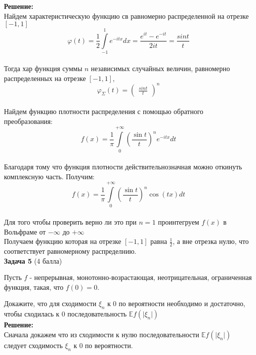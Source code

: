 \documentclass{article}
\begin{document}
\textbf{Решение:}\\
Найдем характеристическую функцию св равномерно 
распределенной на отрезке $[-1, 1]$\\
$$\varphi(t) = \frac{1}{2}\int\limits_{-1}^{1} e^{-itx}dx = \frac{e^{it} - e^{-it}}{2it} = \frac{sint}{t}$$\\
Тогда хар функция суммы $n$ независимых случайных величин, равномерно 
распределенных на отрезке $[-1, 1]$,\\
$$\varphi_\Sigma(t) = \begin{pmatrix}
\frac{sint}{t}
\end{pmatrix}^n$$\\
Найдем функцию плотности распределения с помощью обратного преобразования:\\
$$f(x) = \frac{1}{\pi}  \int\limits_{0}^{+\infty} \left(\frac{\sin t}{t} \right)^n e^{-itx} dt$$\\
Благодаря тому что функция плотности действительнозначная можно откинуть комплексную часть. Получим:\\
$$f(x) = \frac{1}{\pi}  \int\limits_{0}^{+\infty} \left(\frac{\sin t}{t} \right)^n \cos(tx) dt$$\\

Для того чтобы проверить верно ли это при $n=1$ проинтегруем $f(x)$ в Вольфраме от $-\infty$ до $+\infty$\\
Получаем функцию которая на отрезке $[-1, 1]$ равна $\frac{1}{2}$, а вне отрезка нулю, что соответствует равномерному распределнию.\\

\textbf{Задача 5} (4 балла)

Пусть $f$ - непрерывная, монотонно-возрастающая, неотрицательная, ограниченная функция, такая, что $f(0) = 0$.

Докажите, что для сходимости $\xi_n$ к 0 по вероятности необходимо и достаточно, чтобы сходилась к 0 последовательность $\mathbb E f(\vert \xi_n \vert)$\\

\textbf{Решение:}\\
Сначала докажем что из сходимости к нулю последовательности  $\mathbb E f(\vert \xi_n \vert)$ следует сходимость $\xi_n$ к 0 по вероятности.\\
\end{document}
